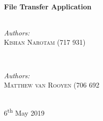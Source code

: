 \documentclass[10pt, conference]{IEEEtran}
\begin{document}
\begin{titlepage}

\HRule \\[0.4cm]
{ \huge \bfseries File Transfer Application}\\[0.4cm] %
\HRule \\[1.5cm]
 



\begin{minipage}{0.4\textwidth}
\begin{flushleft} \large
	\emph{Authors:}\\
	\textsc{Kishan Narotam (717 931)} 
\end{flushleft}
\end{minipage}
~
\begin{minipage}{0.4\textwidth}
\begin{flushright} \large
	\emph{Authors:} \\
	\textsc{Matthew van Rooyen (706 692} 
\end{flushright}
\end{minipage}\\[1cm]


{\large 6\textsuperscript{th} May 2019}\\[2cm] %


 

\end{titlepage}
\end{document}
